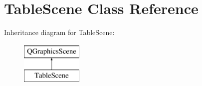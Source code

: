 \hypertarget{class_table_scene}{\section{Table\+Scene Class Reference}
\label{class_table_scene}
}
Inheritance diagram for Table\+Scene\+:\begin{figure}[H]
\begin{center}
\leavevmode
\includegraphics[height=2.000000cm]{class_table_scene}
\end{center}
\end{figure}

